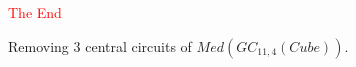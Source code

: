 \documentclass[%
pdf,
colorBG,
slideColor,
]{prosper}
\begin{document}
%
%
%
%
%
%
%
%







\begin{slide}{}
\vspace{-7mm}
\begin{center}
{\Large \textcolor{red}{The End}}\par
{}\par
Removing $3$ central circuits of $Med(GC_{11,4}(Cube))$.
\end{center}
\end{slide}
\end{document}
